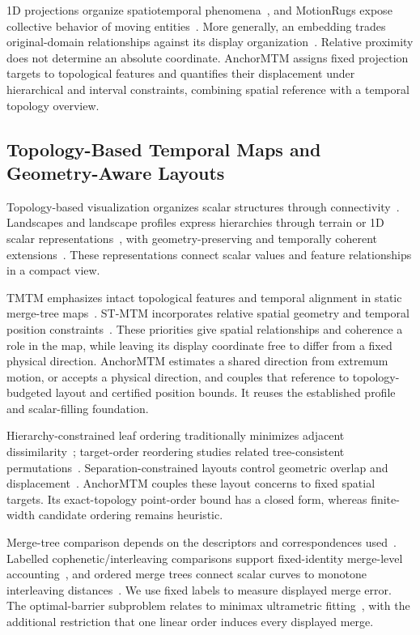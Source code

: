 \documentclass[review]{vgtc}
\begin{document}
1D projections organize spatiotemporal phenomena~\cite{Franke:2021:1DP}, and MotionRugs expose collective behavior of moving entities~\cite{Buchmueller:2019:MR}. More generally, an embedding trades original-domain relationships against its display organization~\cite{Nonato:2019:MP}. Relative proximity does not determine an absolute coordinate. AnchorMTM assigns fixed projection targets to topological features and quantifies their displacement under hierarchical and interval constraints, combining spatial reference with a temporal topology overview.

\subsection{Topology-Based Temporal Maps and Geometry-Aware Layouts}
Topology-based visualization organizes scalar structures through connectivity~\cite{Heine:2016:Survey}. Landscapes and landscape profiles express hierarchies through terrain or 1D scalar representations~\cite{Weber:2007:TL,Oesterling:2013:TLP}, with geometry-preserving and temporally coherent extensions~\cite{Beketayev:2012:GPTL,Herick:2020:TCTL}. These representations connect scalar values and feature relationships in a compact view.

TMTM emphasizes intact topological features and temporal alignment in static merge-tree maps~\cite{Koepp:2023:TMTM}. ST-MTM incorporates relative spatial geometry and temporal position constraints~\cite{STMTM:2026}. These priorities give spatial relationships and coherence a role in the map, while leaving its display coordinate free to differ from a fixed physical direction. AnchorMTM estimates a shared direction from extremum motion, or accepts a physical direction, and couples that reference to topology-budgeted layout and certified position bounds. It reuses the established profile and scalar-filling foundation.



Hierarchy-constrained leaf ordering traditionally minimizes adjacent dissimilarity~\cite{BarJoseph:2001:OLO}; target-order reordering studies related tree-consistent permutations~\cite{Bulteau:2022:RT}. Separation-constrained layouts control geometric overlap and displacement~\cite{Dwyer:2006:IPSEP,Li:2019:SOI}. AnchorMTM couples these layout concerns to fixed spatial targets. Its exact-topology point-order bound has a closed form, whereas finite-width candidate ordering remains heuristic.

Merge-tree comparison depends on the descriptors and correspondences used~\cite{Yan:2021:Survey}. Labelled cophenetic/interleaving comparisons support fixed-identity merge-level accounting~\cite{Munch:2019:LINF,Gasparovic:2024:IID}, and ordered merge trees connect scalar curves to monotone interleaving distances~\cite{Beurskens:2025:OMT}. We use fixed labels to measure displayed merge error. The optimal-barrier subproblem relates to minimax ultrametric fitting~\cite{Farach:1995:RM}, with the additional restriction that one linear order induces every displayed merge.
\end{document}
